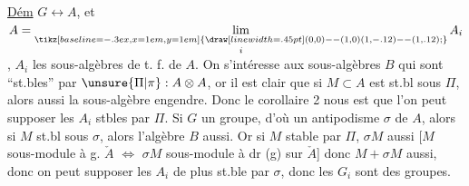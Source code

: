 \uline{Dém} $G\longleftrightarrow A$,  et $A=\underset{i}{\underset{\mathrel{\tikz[baseline=-.3ex,x=1em,y=1em]{\draw[line width=.45pt] (0,0)--(1,0) (1,-.12)--(1,.12);}}}{\mathrm{lim}}}\,A_i$, $A_i$ les sous-algèbres de t. f. de $A$. On s'intéresse aux sous-algèbres $B$ qui sont ``st.bles'' par $\unsure{\Pi|\pi}:A\otimes A$, or il est clair que si
$M\subset A$ est st.bl sous $\Pi$, alors aussi la sous-algèbre  engendre. Donc le corollaire 2 nous est que l'on peut supposer les $A_i$ stbles par $\Pi$. Si $G$ un groupe, d'où un antipodisme
$\sigma$ de $A$, alors si $M$ st.bl sous $\sigma$, alors l'algèbre $B$ aussi. Or si $M$ stable par $\Pi$, $\sigma M$ aussi [$M$ sous-module à g.  $\check A$ $\Longleftrightarrow$ $\sigma M$ sous-module à dr (g) sur $\check A$] donc $M+\sigma M$ aussi, donc on peut supposer les $A_i$ de plus st.ble par $\sigma$, donc les $G_i$ sont des groupes.

